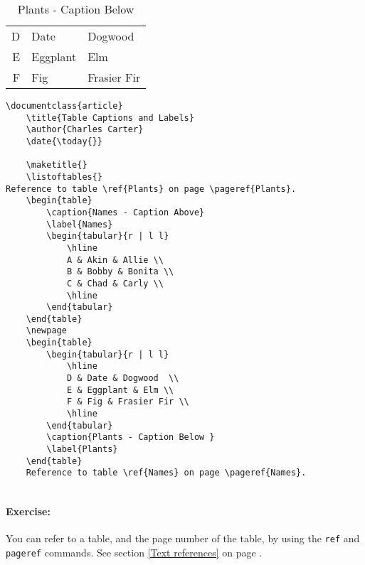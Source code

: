     \begin{table}
        \begin{tabular}{r | l l}
            \hline
            D & Date & Dogwood  \\
            E & Eggplant & Elm \\
            F & Fig & Frasier Fir \\
            \hline
        \end{tabular}
    \caption{Plants - Caption Below}
    \label{Plants}
    \end{table}

        \begin{verbatim}
\documentclass{article}
    \title{Table Captions and Labels}
    \author{Charles Carter}
    \date{\today{}}
 
    \maketitle{}
    \listoftables{}
Reference to table \ref{Plants} on page \pageref{Plants}.
    \begin{table}
        \caption{Names - Caption Above}
        \label{Names}
        \begin{tabular}{r | l l}
            \hline
            A & Akin & Allie \\
            B & Bobby & Bonita \\
            C & Chad & Carly \\
            \hline
        \end{tabular}
    \end{table}
    \newpage
    \begin{table}
        \begin{tabular}{r | l l}
            \hline
            D & Date & Dogwood  \\
            E & Eggplant & Elm \\
            F & Fig & Frasier Fir \\
            \hline
        \end{tabular}
        \caption{Plants - Caption Below }
        \label{Plants}
    \end{table}
    Reference to table \ref{Names} on page \pageref{Names}.
    
        \end{verbatim}

        \paragraph{Exercise:} You can refer to a table, and the page number of the table, by using the \texttt{ref} and \texttt{pageref} commands. See section \ref{Text references} on page \pageref{Text references}.

